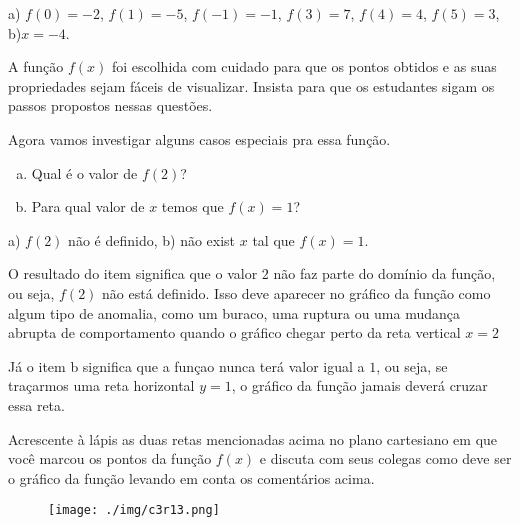 \documentclass[main_estudante.tex]{subfiles}
\begin{document}
\begin{gabarito}
	\begin{gabaritoQuestao}
		a) $f(0)=-2$, $f(1)=-5$, $f(-1)=-1$, $f(3)=7$, $f(4)=4$, $f(5)=3$, b)$x=-4$.
	\end{gabaritoQuestao}
\end{gabarito}

\paraTutores

A função $f(x)$ foi escolhida com cuidado para que os pontos obtidos e as suas propriedades sejam fáceis de visualizar. Insista para que os estudantes sigam os passos propostos nessas questões.

\paraAmbos

\begin{questao}
Agora vamos investigar alguns casos especiais pra essa função.
\begin{enumerate}[a)]
\item Qual é o valor de $f(2)$?
\item Para qual valor de $x$ temos que $f(x)=1$?
\end{enumerate}
\end{questao}

\begin{gabarito}
	\begin{gabaritoQuestao}
		a) $f(2)$ não é definido, b) não exist $x$ tal que $f(x)=1$.
	\end{gabaritoQuestao}
\end{gabarito}

O resultado do item significa que o valor $2$ não faz parte do domínio da função, ou seja, $f(2)$ não está definido. Isso deve aparecer no gráfico da função como algum tipo de anomalia, como um buraco, uma ruptura ou uma mudança abrupta de comportamento quando o gráfico chegar perto da reta vertical $x=2$

Já o item b significa que a funçao nunca terá valor igual a $1$, ou seja, se traçarmos uma reta horizontal $y=1$, o gráfico da função jamais deverá cruzar essa reta.

\begin{questao}
Acrescente à lápis as duas retas mencionadas acima no plano cartesiano em que você marcou os pontos da função $f(x)$ e discuta com seus colegas como deve ser o gráfico da função levando em conta os comentários acima.
\end{questao}

\begin{gabarito}
	\begin{gabaritoQuestao}
	
		\begin{figure}[h]
        \centering
        \texttt{[image: ./img/c3r13.png]}
        \end{figure}
        
	\end{gabaritoQuestao}
\end{gabarito}
\end{document}
